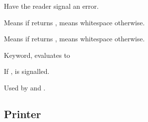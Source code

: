 \begin{LIST}{1cm}
  \IT{\KWD{\#\boldmath$<$}}
  Have the reader signal an error.

  Means  if  returns \T, means whitespace otherwise.

  Means  if  returns \NIL, means whitespace otherwise.

   Keyword, evaluates to 

  If \NIL,    is signalled.

  Used by \kwd{\#+} and \kwd{\#--}.

\end{LIST}


\subsection{Printer} 


